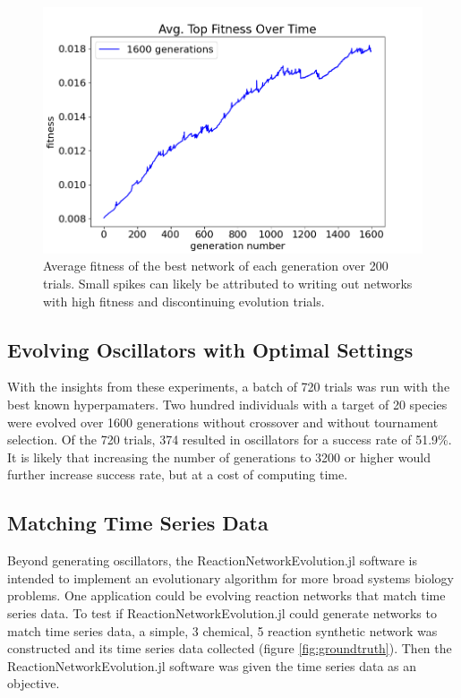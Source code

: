 \documentclass[12pt]{report}
\begin{document}
\begin{figure}
\centering
    \includegraphics[width=15cm]{images/1600_top_fitness.png}
    \caption[Average top fitness over 1600 generations]{Average fitness of the best network of each generation over 200 trials. Small spikes can likely be attributed to writing out networks with high fitness and discontinuing evolution trials.}
    \label{fig:1600_top_fitness}
\end{figure}


\subsection{Evolving Oscillators with Optimal Settings}
With the insights from these experiments, a batch of 720 trials was run with the best known hyperpamaters. Two hundred individuals with a target of 20 species were evolved over 1600 generations without crossover and without tournament selection. Of the 720 trials, 374 resulted in oscillators for a success rate of 51.9\%. It is likely that increasing the number of generations to 3200 or higher would further increase success rate, but at a cost of computing time.

\subsection{Matching Time Series Data}
Beyond generating oscillators, the ReactionNetworkEvolution.jl software is intended to implement an evolutionary algorithm for more broad systems biology problems. One application could be evolving reaction networks that match time series data. To test if ReactionNetworkEvolution.jl could generate networks to match time series data, a simple, 3 chemical, 5 reaction synthetic network was constructed and its time series data collected (figure \ref{fig:groundtruth}). Then the ReactionNetworkEvolution.jl software was given the time series data as an objective. 
\end{document}

